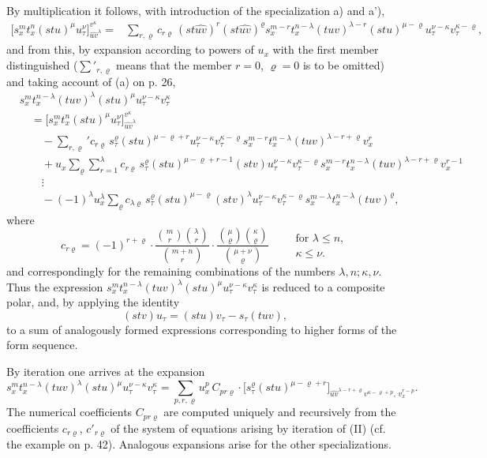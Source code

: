 \documentclass[11pt]{article}
\begin{document}
By multiplication it follows, with introduction of the specialization a) and a'),
\[
\begin{aligned}
\bigl[s_x^m t_x^n(stu)^\mu u_\tau^\nu\bigr]_{\widehat{uv}^{\lambda}}^{v^\kappa}
={}&
\sum_{r,\varrho}c_{r\varrho}\,
(st\widehat{uv})^r(st\widehat{uv})^\varrho
s_x^{m-r}t_x^{n-\lambda}(tuv)^{\lambda-r}(stu)^{\mu-\varrho}
u_\tau^{\nu-\kappa}v_\tau^{\kappa-\varrho},
\end{aligned}
\]
and from this, by expansion according to powers of $u_x$ with the first member distinguished ($\sum'_{r,\varrho}$ means that the member $r=0$, $\varrho=0$ is to be omitted) and taking account of (a) on p. 26,
\[
\tag{II}
\begin{aligned}
&s_x^m t_x^{n-\lambda}(tuv)^\lambda(stu)^\mu u_\tau^{\nu-\kappa}v_\tau^\kappa\\
&\quad =
\bigl[s_x^m t_x^n(stu)^\mu u_\tau^\nu\bigr]_{\widehat{uv}^{\lambda}}^{v^\kappa}\\
&\qquad
-\sum_{r,\varrho}' c_{r\varrho}\,s_\tau^\varrho(stu)^{\mu-\varrho+r}
u_\tau^{\nu-\kappa}v_\tau^{\kappa-\varrho}
s_x^{m-r}t_x^{n-\lambda}(tuv)^{\lambda-r+\varrho}v_x^r\\
&\qquad
+u_x\sum_{\varrho}\sum_{r=1}^{\lambda} c_{r\varrho}\,
s_\tau^\varrho(stu)^{\mu-\varrho+r-1}(stv)
u_\tau^{\nu-\kappa}v_\tau^{\kappa-\varrho}
s_x^{m-r}t_x^{n-\lambda}(tuv)^{\lambda-r+\varrho}v_x^{r-1}\\
&\qquad
\vdots\\
&\qquad
-(-1)^\lambda  u_x^\lambda\sum_\varrho c_{\lambda\varrho}\,
s_\tau^\varrho(stu)^{\mu-\varrho}(stv)^\lambda
u_\tau^{\nu-\kappa}v_\tau^{\kappa-\varrho}
s_x^{m-\lambda}t_x^{n-\lambda}(tuv)^\varrho,
\end{aligned}
\]
where
\[
c_{r\varrho}=(-1)^{r+\varrho}\cdot
\frac{\binom{m}{r}\binom{\lambda}{r}}{\binom{m+n}{r}}\cdot
\frac{\binom{\mu}{\varrho}\binom{\kappa}{\varrho}}{\binom{\mu+\nu}{\varrho}}
\qquad
\begin{array}{l}
\text{for }\lambda\le n,\\
\kappa\le\nu.
\end{array}
\]
and correspondingly for the remaining combinations of the numbers $\lambda,n;\kappa,\nu$. Thus the expression $s_x^m t_x^{n-\lambda}(tuv)^\lambda(stu)^\mu u_\tau^{\nu-\kappa}v_\tau^\kappa$ is reduced to a composite polar, and, by applying the identity
\[
(stv)u_\tau=(stu)v_\tau-s_\tau(tuv),
\]
to a sum of analogously formed expressions corresponding to higher forms of the form sequence.

By iteration one arrives at the expansion
\[
\tag{III}
s_x^m t_x^{n-\lambda}(tuv)^\lambda(stu)^\mu u_\tau^{\nu-\kappa}v_\tau^\kappa
=
\sum_{p,r,\varrho}u_x^p\,C_{pr\varrho}\cdot
\bigl[s_\tau^\varrho(stu)^{\mu-\varrho+r}\bigr]_{\widehat{uv}^{\lambda-r+\varrho}v^{\kappa-\varrho+p},\,v_x^{r-p}}.
\]
The numerical coefficients $C_{pr\varrho}$ are computed uniquely and recursively from the coefficients $c_{r\varrho}$, $c'_{r\varrho}$ of the system of equations arising by iteration of (II) (cf. the example on p. 42). Analogous expansions arise for the other specializations.
\end{document}
